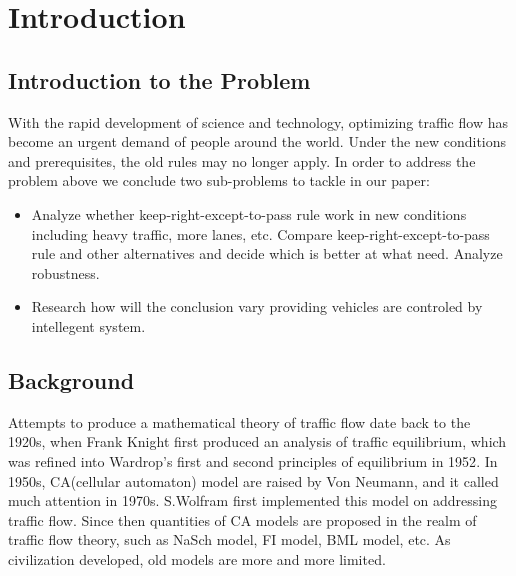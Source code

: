 \section{Introduction}
\subsection{Introduction to the Problem}
With the rapid development of science and technology, optimizing traffic flow has become an urgent demand of people around the world. Under the new conditions and prerequisites, the old rules may no longer apply. In order to address the problem above we conclude two sub-problems to tackle in our paper: 
\begin{itemize}
\item Analyze whether keep-right-except-to-pass rule work in new conditions including heavy traffic, more lanes, etc. Compare keep-right-except-to-pass rule and other alternatives and decide which is better at what need. Analyze robustness. 
\item Research how will the conclusion vary providing vehicles are controled by intellegent system. 
\end{itemize}
\subsection{Background}
Attempts to produce a mathematical theory of traffic flow date back to the 1920s, when Frank Knight first produced an analysis of traffic equilibrium, which was refined into Wardrop's first and second principles of equilibrium in 1952\cite{trafficflowhistory}. In 1950s, CA(cellular automaton) model are raised by Von Neumann, and it called much attention in 1970s. S.Wolfram first implemented this model on addressing traffic flow\cite{1983RvMP...55..601W}. Since then quantities of CA models are proposed in the realm of traffic flow theory, such as NaSch model, FI model, BML model, etc. As civilization developed, old models are more and more limited. 

